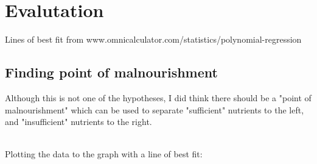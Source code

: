 \documentclass{article}
\begin{document}
\section{Evalutation}

Lines of best fit from www.omnicalculator.com/statistics/polynomial-regression

\subsection{Finding point of malnourishment}

Although this is not one of the hypotheses, I did think there should be a "point of malnourishment" which can be used to separate "sufficient" nutrients to the left, and "insufficient" nutrients to the right.

\noindent\\
Plotting the data to the graph with a line of best fit:
\end{document}
